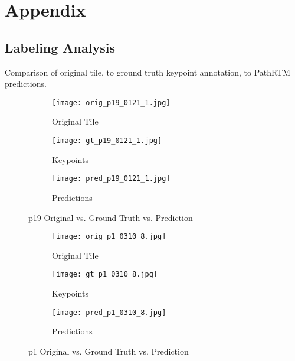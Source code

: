 \documentclass[runningheads]{llncs}
\begin{document}
%
%
%
\medskip




%



\section{Appendix} \label{appendix}


\subsection{Labeling Analysis}\label{appendixlabeling}{
	Comparison of original tile, to ground truth keypoint annotation, to PathRTM predictions.
	        
	        
	\begin{figure}
		\centering
		\begin{subfigure}[b]{0.3\textwidth}
			\centering
			\texttt{[image: orig\_p19\_0121\_1.jpg]}
			\caption{Original Tile}
			\label{fig:p19orig}
		\end{subfigure}
		\hfill
		\begin{subfigure}[b]{0.3\textwidth}
			\centering
			\texttt{[image: gt\_p19\_0121\_1.jpg]}
			\caption{Keypoints}
			\label{fig:p19kp}
		\end{subfigure}
		\hfill
		\begin{subfigure}[b]{0.3\textwidth}
			\centering
			\texttt{[image: pred\_p19\_0121\_1.jpg]}
			\caption{Predictions}
			\label{fig:p19bbox}
		\end{subfigure}
		\caption{p19 Original vs. Ground Truth vs. Prediction}
		\label{fig:p19_0121_1_gtbbox}
	\end{figure}
	    
	    
	    
	\begin{figure}
		\centering
		\begin{subfigure}[b]{0.3\textwidth}
			\centering
			\texttt{[image: orig\_p1\_0310\_8.jpg]}
			\caption{Original Tile}
			\label{fig:p1orig}
		\end{subfigure}
		\hfill
		\begin{subfigure}[b]{0.3\textwidth}
			\centering
			\texttt{[image: gt\_p1\_0310\_8.jpg]}
			\caption{Keypoints}
			\label{fig:p1kp}
		\end{subfigure}
		\hfill
		\begin{subfigure}[b]{0.3\textwidth}
			\centering
			\texttt{[image: pred\_p1\_0310\_8.jpg]}
			\caption{Predictions}
			\label{fig:p1bbox}
		\end{subfigure}
		\caption{p1 Original vs. Ground Truth vs. Prediction}
		\label{fig:p1_0310_8_gtvpred}
	\end{figure}
	    
}
    
\end{document}
